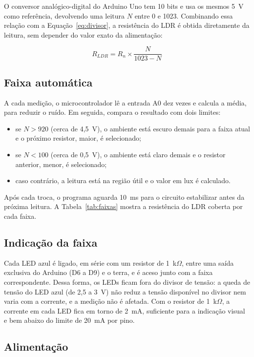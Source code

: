 \documentclass[11pt,a4paper]{article}
\begin{document}
O conversor analógico-digital do Arduino Uno tem 10 bits e usa os mesmos 5~V como referência, devolvendo uma leitura $N$ entre 0 e 1023. Combinando essa relação com a Equação~\ref{eq:divisor}, a resistência do LDR é obtida diretamente da leitura, sem depender do valor exato da alimentação:

\begin{equation}
	R_{LDR} = R_n \times \frac{N}{1023 - N}
	\label{eq:resistencia}
\end{equation}

\subsection*{Faixa automática}

A cada medição, o microcontrolador lê a entrada A0 dez vezes e calcula a média, para reduzir o ruído. Em seguida, compara o resultado com dois limites:

\begin{itemize}
	\item se $N > 920$ (cerca de 4,5~V), o ambiente está escuro demais para a faixa atual e o próximo resistor, maior, é selecionado;
	\item se $N < 100$ (cerca de 0,5~V), o ambiente está claro demais e o resistor anterior, menor, é selecionado;
	\item caso contrário, a leitura está na região útil e o valor em lux é calculado.
\end{itemize}

Após cada troca, o programa aguarda 10~ms para o circuito estabilizar antes da próxima leitura. A Tabela~\ref{tab:faixas} mostra a resistência do LDR coberta por cada faixa.

\subsection*{Indicação da faixa}

Cada LED azul é ligado, em série com um resistor de 1~k$\Omega$, entre uma saída exclusiva do Arduino (D6 a D9) e o terra, e é aceso junto com a faixa correspondente. Dessa forma, os LEDs ficam fora do divisor de tensão: a queda de tensão do LED azul (de 2,5 a 3~V) não reduz a tensão disponível no divisor nem varia com a corrente, e a medição não é afetada. Com o resistor de 1~k$\Omega$, a corrente em cada LED fica em torno de 2~mA, suficiente para a indicação visual e bem abaixo do limite de 20~mA por pino.

\subsection*{Alimentação}
\end{document}
